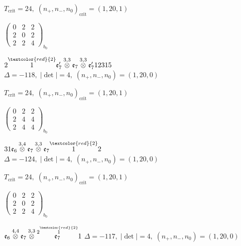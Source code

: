 \documentclass[10pt]{article}
\begin{document}
\hspace{1em}$T_{\text{crit}}=24,\; (n_+,n_-,n_0)_{\text{crit}}=(1,20,1)$

\hspace{2em}$\left(\begin{smallmatrix}0 & 2 & 2 \\ 2 & 0 & 2 \\ 2 & 2 & 4\end{smallmatrix}\right)_{\!b_0}$

\smallskip

$2\overset{\textcolor{red}{2}}{1}\mathfrak{e}_7'\overset{3,3}{\otimes}\mathfrak{e}_7\overset{3,3}{\otimes}\mathfrak{e}_7'12315$ \quad $\Delta=-118,\; |\det|=4,\; (n_+,n_-,n_0)=(1,20,0)$

\hspace{1em}$T_{\text{crit}}=24,\; (n_+,n_-,n_0)_{\text{crit}}=(1,20,1)$

\hspace{2em}$\left(\begin{smallmatrix}0 & 2 & 2 \\ 2 & 4 & 4 \\ 2 & 4 & 4\end{smallmatrix}\right)_{\!b_0}$

\smallskip

$31\mathfrak{e}_6\overset{3,4}{\otimes}\mathfrak{e}_7\overset{3,3}{\otimes}\mathfrak{e}_7\overset{\textcolor{red}{2}}{1}2$ \quad $\Delta=-124,\; |\det|=4,\; (n_+,n_-,n_0)=(1,20,0)$

\hspace{1em}$T_{\text{crit}}=24,\; (n_+,n_-,n_0)_{\text{crit}}=(1,20,1)$

\hspace{2em}$\left(\begin{smallmatrix}0 & 2 & 2 \\ 2 & 0 & 2 \\ 2 & 2 & 4\end{smallmatrix}\right)_{\!b_0}$

\smallskip

$\mathfrak{e}_6\overset{4,4}{\otimes}\mathfrak{e}_7\overset{3,3}{\otimes}\overset{2\overset{\textcolor{red}{2}}{1}}{\mathfrak{e}_7}1$ \quad $\Delta=-117,\; |\det|=4,\; (n_+,n_-,n_0)=(1,20,0)$
\end{document}

